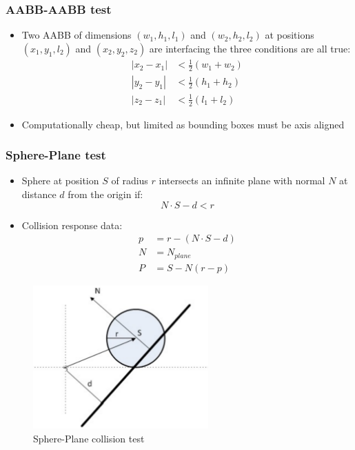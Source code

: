 \documentclass[a4paper]{article}
\begin{document}
\subsubsection{AABB-AABB test}

\begin{itemize}
  \item
    Two AABB of dimensions $(w_{1}, h_{1}, l_{1})$ and $(w_{2}, h_{2}, l_{2})$
    at positions $(x_{1}, y_{1}, l_{2})$ and $(x_{2}, y_{2}, z_{2})$ are
    interfacing the three conditions are all true:
    \begin{align*}
      |x_{2} - x_{1}| &< \frac{1}{2}(w_{1} + w_{2}) \\
      |y_{2} - y_{1}| &< \frac{1}{2}(h_{1} + h_{2}) \\
      |z_{2} - z_{1}| &< \frac{1}{2}(l_{1} + l_{2})
    \end{align*}

  \item
    Computationally cheap, but limited as bounding boxes must be axis aligned

\end{itemize}

\subsubsection{Sphere-Plane test}

\begin{itemize}
  \item
    Sphere at position $S$ of radius $r$ intersects an infinite plane with
    normal $N$ at distance $d$ from the origin if:
    \[
      N \cdot S -d < r
    \]

  \item
    Collision response data:
    \begin{align*}
      p &= r - (N \cdot S - d) \\
      N &= N_{plane} \\
      P &= S - N(r - p)
    \end{align*}

\end{itemize}

\begin{figure}[h!]
  \centering
  \includegraphics[width=0.6\textwidth]{graphics/plane_collision_detection.eps}
  \caption{Sphere-Plane collision test}
  \label{fig:plane_collision_detection}
\end{figure}
\FloatBarrier
\end{document}
